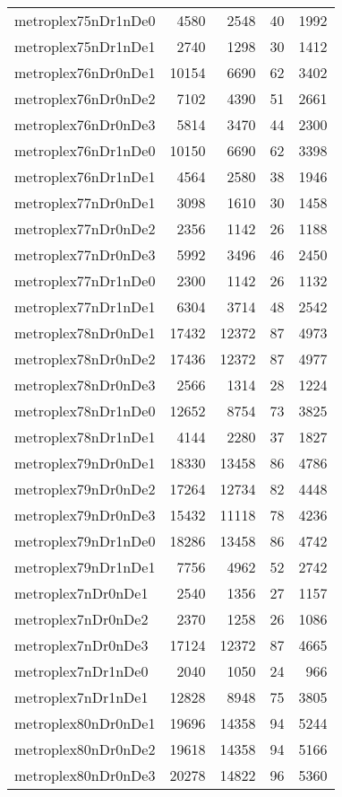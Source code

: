 \begin{tabular}{lrrrr}
metroplex75nDr1nDe0 & 4580 & 2548 & 40 & 1992 \\
metroplex75nDr1nDe1 & 2740 & 1298 & 30 & 1412 \\
metroplex76nDr0nDe1 & 10154 & 6690 & 62 & 3402 \\
metroplex76nDr0nDe2 & 7102 & 4390 & 51 & 2661 \\
metroplex76nDr0nDe3 & 5814 & 3470 & 44 & 2300 \\
metroplex76nDr1nDe0 & 10150 & 6690 & 62 & 3398 \\
metroplex76nDr1nDe1 & 4564 & 2580 & 38 & 1946 \\
metroplex77nDr0nDe1 & 3098 & 1610 & 30 & 1458 \\
metroplex77nDr0nDe2 & 2356 & 1142 & 26 & 1188 \\
metroplex77nDr0nDe3 & 5992 & 3496 & 46 & 2450 \\
metroplex77nDr1nDe0 & 2300 & 1142 & 26 & 1132 \\
metroplex77nDr1nDe1 & 6304 & 3714 & 48 & 2542 \\
metroplex78nDr0nDe1 & 17432 & 12372 & 87 & 4973 \\
metroplex78nDr0nDe2 & 17436 & 12372 & 87 & 4977 \\
metroplex78nDr0nDe3 & 2566 & 1314 & 28 & 1224 \\
metroplex78nDr1nDe0 & 12652 & 8754 & 73 & 3825 \\
metroplex78nDr1nDe1 & 4144 & 2280 & 37 & 1827 \\
metroplex79nDr0nDe1 & 18330 & 13458 & 86 & 4786 \\
metroplex79nDr0nDe2 & 17264 & 12734 & 82 & 4448 \\
metroplex79nDr0nDe3 & 15432 & 11118 & 78 & 4236 \\
metroplex79nDr1nDe0 & 18286 & 13458 & 86 & 4742 \\
metroplex79nDr1nDe1 & 7756 & 4962 & 52 & 2742 \\
metroplex7nDr0nDe1 & 2540 & 1356 & 27 & 1157 \\
metroplex7nDr0nDe2 & 2370 & 1258 & 26 & 1086 \\
metroplex7nDr0nDe3 & 17124 & 12372 & 87 & 4665 \\
metroplex7nDr1nDe0 & 2040 & 1050 & 24 & 966 \\
metroplex7nDr1nDe1 & 12828 & 8948 & 75 & 3805 \\
metroplex80nDr0nDe1 & 19696 & 14358 & 94 & 5244 \\
metroplex80nDr0nDe2 & 19618 & 14358 & 94 & 5166 \\
metroplex80nDr0nDe3 & 20278 & 14822 & 96 & 5360 \\

\end{tabular}
